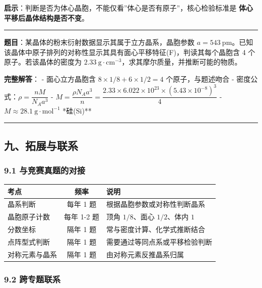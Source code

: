 \textbf{启示}：判断是否为体心晶胞，不能仅看''体心是否有原子''，核心检验标准是 \textbf{体心平移后晶体结构是否不变}。

\begin{center}\rule{0.5\linewidth}{0.5pt}\end{center}

\textbf{题目}：某晶体的粉末衍射数据显示其属于立方晶系，晶胞参数 \(a = 543\ \mathrm{pm}\)。已知该晶体中原子排列的对称性显示其具有面心平移特征(F)，判读其每个晶胞含 4 个原子。若该晶体的密度为 \(2.33\ \mathrm{g\cdot cm^{-3}}\)，求其摩尔质量，并推断可能的物质。

\textbf{完整解答}：
- 面心立方晶胞含 \(8 \times 1/8 + 6 \times 1/2 = 4\) 个原子，与题述吻合
- 密度公式：\(\rho = \dfrac{nM}{N_A a^3}\)
- \(M = \dfrac{\rho N_A a^3}{n} = \dfrac{2.33 \times 6.022\times 10^{23} \times (5.43\times 10^{-8})^3}{4}\)
- \(M \approx 28.1\ \mathrm{g\cdot mol^{-1}}\) \箭 **硅(Si)**

\begin{center}\rule{0.5\linewidth}{0.5pt}\end{center}

\subsection{九、拓展与联系}\label{ux4e5dux62d3ux5c55ux4e0eux8054ux7cfb}

\subsubsection{9.1 与竞赛真题的对接}\label{ux4e0eux7adeux8d5bux771fux9898ux7684ux5bf9ux63a5}

{\def\LTcaptype{none} %
\begin{longtable}[]{@{}lcl@{}}
\toprule\noalign{}
考点 & 频率 & 说明 \\
\midrule\noalign{}
\endhead
\bottomrule\noalign{}
\endlastfoot
晶系判断 & 每年 1 题 & 根据晶胞参数或对称性判断晶系 \\
晶胞原子计数 & 每年 1-2 题 & 顶角 \(1/8\)、面心 \(1/2\)、体内 \(1\) \\
分数坐标 & 隔年 1 题 & 常与密度计算、化学式推断结合 \\
点阵型式判断 & 隔年 1 题 & 需要通过等同点系或平移检验判断 \\
对称元素与晶系 & 隔年 1 题 & 由对称元素反推晶系归属 \\
\end{longtable}
}

\subsubsection{9.2 跨专题联系}\label{ux8de8ux4e13ux9898ux8054ux7cfb}

